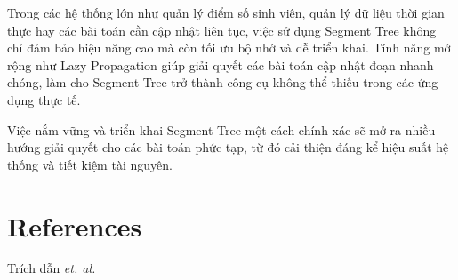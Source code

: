 \documentclass[a4paper]{article}
\begin{document}
Trong các hệ thống lớn như quản lý điểm số sinh viên, quản lý dữ liệu thời gian thực hay các bài toán cần cập nhật liên tục, việc sử dụng Segment Tree không chỉ đảm bảo hiệu năng cao mà còn tối ưu bộ nhớ và dễ triển khai. Tính năng mở rộng như Lazy Propagation giúp giải quyết các bài toán cập nhật đoạn nhanh chóng, làm cho Segment Tree trở thành công cụ không thể thiếu trong các ứng dụng thực tế.  \medskip

Việc nắm vững và triển khai Segment Tree một cách chính xác sẽ mở ra nhiều hướng giải quyết cho các bài toán phức tạp, từ đó cải thiện đáng kể hiệu suất hệ thống và tiết kiệm tài nguyên.  



\pagebreak
\section{References}

\label{sec:citations}
Trích dẫn \textit{et. al.} \cite{segment_tree_vnoi,segment_tree_cpalgorithms,segment_tree_geeksforgeeks}



\end{document}
